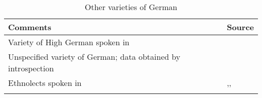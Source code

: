 \begin{table}
\caption{Other varieties of German}
\begin{tabularx}{\textwidth}{Ql}
\lsptoprule
Comments & Source\\\midrule
Variety of High German spoken in  & \citet{Glove2011,Glover2014}\\
\midrule
Unspecified variety of German; data obtained by introspection & \citet{Moltmann1990}\\
\midrule
Ethnolects spoken in  & \citet{Auer2002},\citet{Wiese2012}, \citet{JannedyWeirich2014}\\
\lspbottomrule
\end{tabularx}
\end{table}
